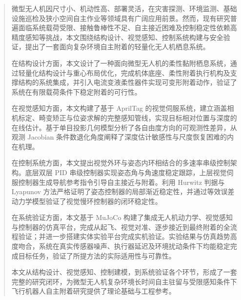 

\begin{abstract}
微型无人机因尺寸小、机动性高、部署灵活，在灾害探测、环境监测、基础设施巡检及狭小空间自主作业等领域具有广阔应用前景。然而，现有研究普遍面临系统载荷受限、接触鲁棒性不足、自主接近困难及控制稳定性依赖高精度感知等挑战，本文围绕结构设计、视觉感知、控制系统构建与安全验证，提出了一套面向复杂环境自主附着的轻量化无人机栖息系统。

在结构设计方面，本文设计了一种面向微型无人机的柔性黏附栖息系统，通过轻量化结构设计与重心布局优化，完成机体底座、柔性附着执行机构及支撑结构的系统集成，并引入电流变液柔性器件实现可变形附着动作，验证了系统在有限载荷条件下稳定附着的可行性。

在视觉感知方面，本文构建了基于 AprilTag 的视觉伺服系统，建立涵盖相机标定、畸变矫正与位姿求解的完整感知管线，实现目标相对位置与深度的在线估计。基于单目投影几何模型分析了各自由度方向的可观测性差异，从观测 Jacobian 条件数退化角度阐释了深度估计敏感性与尺度恢复困难的内在机理。

在控制系统方面，本文提出视觉外环与姿态内环相结合的多速率串级控制架构。底层双层 PID 串级控制器实现姿态角与角速度稳定跟踪，上层视觉伺服控制器生成导航参考指令引导自主接近与附着。利用 Hurwitz 判据与 Lyapunov 方法严格证明了姿态控制器的局部渐近稳定性，并通过等效误差动力学模型验证了视觉慢环控制器的闭环稳定性。

在系统验证方面，本文基于 MuJoCo 构建了集成无人机动力学、视觉感知与控制器的仿真平台，完成从起飞、视觉对准、逐步接近到最终附着的全流程验证；并进一步搭建实体实验平台完成实机验证。实验结果与仿真趋势高度吻合，系统在真实传感器噪声、执行器延迟及环境扰动条件下均能稳定完成目标任务，验证了所提方法的实际适用性与可靠性。

本文从结构设计、视觉感知、控制建模，到系统验证各个环节，形成了一套完整的研究闭环，为微型无人机复杂环境长时间自主驻留与受限感知条件下飞行机器人自主附着研究提供了理论基础与工程参考。


\end{abstract}

